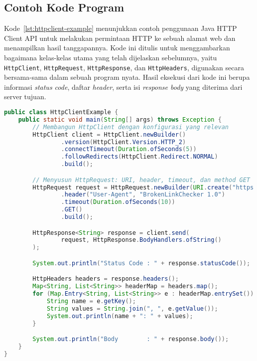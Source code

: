 \subsection{Contoh Kode Program}
\label{subsec:0228-contoh-kode-program}

Kode~\ref{lst:httpclient-example} menunjukkan contoh penggunaan Java HTTP Client API untuk melakukan permintaan HTTP ke sebuah alamat web dan menampilkan hasil tanggapannya. Kode ini ditulis untuk menggambarkan bagaimana kelas-kelas utama yang telah dijelaskan sebelumnya, yaitu \texttt{HttpClient}, \texttt{HttpRequest}, \texttt{HttpResponse}, dan \texttt{HttpHeaders}, digunakan secara bersama-sama dalam sebuah program nyata. Hasil eksekusi dari kode ini berupa informasi \textit{status code}, daftar \textit{header}, serta isi \textit{response body} yang diterima dari server tujuan.

\begin{lstlisting}[language=Java, caption={Contoh penggunaan Java HTTP Client API}, label={lst:httpclient-example}]
public class HttpClientExample {
    public static void main(String[] args) throws Exception {
        // Membangun HttpClient dengan konfigurasi yang relevan
        HttpClient client = HttpClient.newBuilder()
                .version(HttpClient.Version.HTTP_2)
                .connectTimeout(Duration.ofSeconds(5))
                .followRedirects(HttpClient.Redirect.NORMAL)
                .build();

        // Menyusun HttpRequest: URI, header, timeout, dan method GET
        HttpRequest request = HttpRequest.newBuilder(URI.create("https://informatika.unpar.ac.id"))
                .header("User-Agent", "BrokenLinkChecker 1.0")
                .timeout(Duration.ofSeconds(10))
                .GET()
                .build();

        HttpResponse<String> response = client.send(
                request, HttpResponse.BodyHandlers.ofString()
        );

        System.out.println("Status Code : " + response.statusCode());

        HttpHeaders headers = response.headers();
        Map<String, List<String>> headerMap = headers.map();
        for (Map.Entry<String, List<String>> e : headerMap.entrySet()) {
            String name = e.getKey();
            String values = String.join(", ", e.getValue());
            System.out.println(name + ": " + values);
        }

        System.out.println("Body        : " + response.body());
    }
}
\end{lstlisting}

